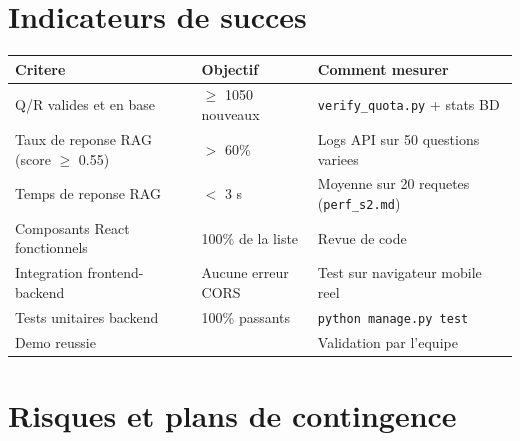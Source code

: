 \documentclass[11pt,a4paper]{article}
\renewcommand{\checkmark}{\ding{52}}
\begin{document}
\clearpage

\section{Indicateurs de succes}

\begin{center}
\begin{tabular}{|p{5.5cm}|p{2.5cm}|p{5cm}|}
\hline
\rowcolor{green!15}
\textbf{Critere} & \textbf{Objectif} & \textbf{Comment mesurer} \\
\hline
Q/R valides et en base & $\geq$ 1050 nouveaux & \texttt{verify\_quota.py} + stats BD \\
\hline
Taux de reponse RAG (score $\geq$ 0.55) & $>$ 60\% & Logs API sur 50 questions variees \\
\hline
Temps de reponse RAG & $<$ 3 s & Moyenne sur 20 requetes (\texttt{perf\_s2.md}) \\
\hline
Composants React fonctionnels & 100\% de la liste & Revue de code \\
\hline
Integration frontend-backend & Aucune erreur CORS & Test sur navigateur mobile reel \\
\hline
Tests unitaires backend & 100\% passants & \texttt{python manage.py test} \\
\hline
Demo reussie & \checkmark & Validation par l'equipe \\
\hline
\end{tabular}
\end{center}

\section{Risques et plans de contingence}
\end{document}
